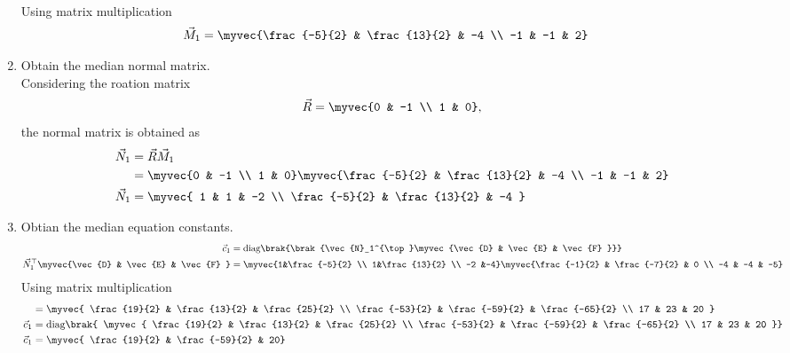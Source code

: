 \documentclass[11pt]{book}
\begin{document}
\begin{enumerate}[label=\thesubsection.\arabic*.,ref=\thesubsection.\theenumi]
\begin{align}
{				  } 
\end{align}
Using matrix multiplication 
  \begin{align}
     \vec{M}_1 &=   \myvec{\frac{-5}{2} & \frac{13}{2} & -4 \\ -1 & -1 & 2}
  \end{align}
\item Obtain the median normal matrix. \\
\solution Considering the roation matrix
\begin{align}
   \vec{R}  = \myvec{0 & -1 \\ 1 & 0},
\end{align}
the normal matrix is obtained as
\begin{align}
   \vec{N}_1 &= \vec{R}\vec{M}_1  \\
   &=\myvec{0 & -1 \\ 1 & 0} \myvec{\frac{-5}{2} & \frac{13}{2} & -4 \\ -1 & -1 & 2} \\
   \vec{N}_1 &=  \myvec{ 1 & 1 & -2 \\ \frac{-5}{2} & \frac{13}{2} & -4 }
\end{align}
\item Obtian the median equation constants. \\
\begin{align}
   \vec{c}_1 &= \text{diag}\brak{\brak{\vec{N}_1^{\top}\myvec{\vec{D} & \vec{E} & \vec{F} }}}  \\
   \vec{N}_1^{\top}\myvec{\vec{D} & \vec{E} & \vec{F} } &= \myvec{1&\frac{-5}{2} \\ 1&\frac{13}{2} \\ -2 
   &-4}\myvec{\frac{-1}{2} & \frac{-7}{2} & 0 \\ -4 & -4 & -5} \\
\end{align}
Using matrix multiplication
\begin{align}
    &=\myvec{ \frac{19}{2} & \frac{13}{2} & \frac{25}{2} \\ \frac{-53}{2} & \frac{-59}{2} & \frac{-65}{2} \\ 17 & 23 & 20 } 
    \\
    \vec{c}_1 &= \text{diag}\brak{ \myvec{ \frac{19}{2} & \frac{13}{2} & \frac{25}{2} \\ \frac{-53}{2} & \frac{-59}{2} & 
    \frac{-65}{2} \\ 17 & 23 & 20 }} \\
    \vec{c}_1 &= \myvec{ \frac{19}{2} & \frac{-59}{2} & 20}

\end{align}
\end{enumerate}
\end{document}
